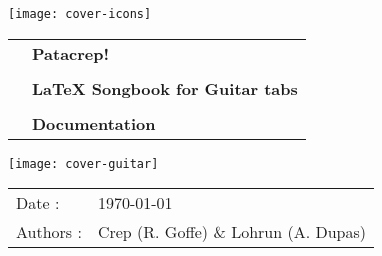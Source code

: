 \begin{titlepage}

  \texttt{[image: cover-icons]}
  \vspace{2cm}

  \begin{tabular}{l l}
    \hspace{2cm} & \textbf{\Huge Patacrep!}\\
    & \\
    & \textbf{\Large \LaTeX{} Songbook for Guitar tabs}\\
    & \\
    & \textbf{\large Documentation}\\
  \end{tabular}

  \hspace{-2cm}\texttt{[image: cover-guitar]}

  \begin{flushright}
    \begin{tabular}{l l}
      Date : & \today \\
      Authors : &  Crep (R. Goffe) \& Lohrun (A. Dupas) \\
    \end{tabular}
  \end{flushright}

\end{titlepage}
